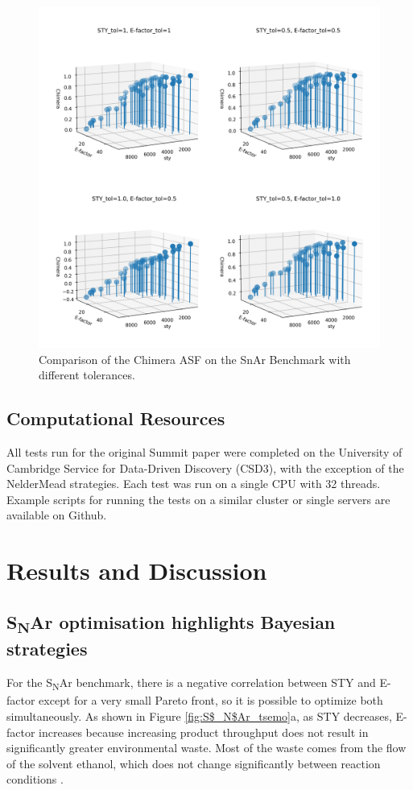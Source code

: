 \begin{figure}
    \includegraphics[width=\textwidth]{gfx/Chapter03/chimera_comparison.png}
    \caption{Comparison of the Chimera ASF on the SnAr Benchmark with different tolerances.}
    \label{fig:chimera_comparsion}
\end{figure}

\subsection{Computational Resources}
All tests run for the original Summit paper were completed on the University of Cambridge Service for Data-Driven Discovery (CSD3), with the exception of the NelderMead strategies. Each test was run on a single CPU with 32 threads. Example scripts for running the tests on a similar cluster or single servers are available on Github. 


\section{Results and Discussion}

\subsection{S\textsubscript{N}Ar optimisation highlights Bayesian strategies}
For the S\textsubscript{N}Ar benchmark, there is a negative correlation between STY and E-factor except for a very small Pareto front, so it is possible to optimize both simultaneously. As shown in Figure \ref{fig:S$_N$Ar_tsemo}a, as STY decreases, E-factor increases because increasing product throughput does not result in significantly greater environmental waste. Most of the waste comes from the flow of the solvent ethanol, which does not change significantly between reaction conditions \cite{Jeraal2020}.

